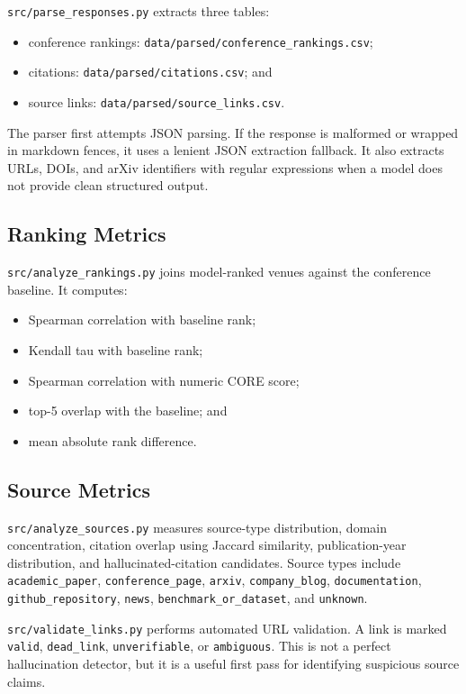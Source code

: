 \documentclass[acmsmall,review,nonacm]{acmart}
\begin{document}
\texttt{src/parse\_responses.py} extracts three tables:

\begin{itemize}
  \item conference rankings:
  \texttt{data/parsed/conference\_rankings.csv};
  \item citations:
  \texttt{data/parsed/citations.csv}; and
  \item source links:
  \texttt{data/parsed/source\_links.csv}.
\end{itemize}

The parser first attempts JSON parsing. If the response is malformed or
wrapped in markdown fences, it uses a lenient JSON extraction fallback. It also
extracts URLs, DOIs, and arXiv identifiers with regular expressions when a
model does not provide clean structured output.

\subsection{Ranking Metrics}

\texttt{src/analyze\_rankings.py} joins model-ranked venues against the
conference baseline. It computes:

\begin{itemize}
  \item Spearman correlation with baseline rank;
  \item Kendall tau with baseline rank;
  \item Spearman correlation with numeric CORE score;
  \item top-5 overlap with the baseline; and
  \item mean absolute rank difference.
\end{itemize}

\subsection{Source Metrics}

\texttt{src/analyze\_sources.py} measures source-type distribution, domain
concentration, citation overlap using Jaccard similarity, publication-year
distribution, and hallucinated-citation candidates. Source types include
\texttt{academic\_paper}, \texttt{conference\_page}, \texttt{arxiv},
\texttt{company\_blog}, \texttt{documentation},
\texttt{github\_repository}, \texttt{news},
\texttt{benchmark\_or\_dataset}, and \texttt{unknown}.

\texttt{src/validate\_links.py} performs automated URL validation. A link is
marked \texttt{valid}, \texttt{dead\_link}, \texttt{unverifiable}, or
\texttt{ambiguous}. This is not a perfect hallucination detector, but it is a
useful first pass for identifying suspicious source claims.
\end{document}
